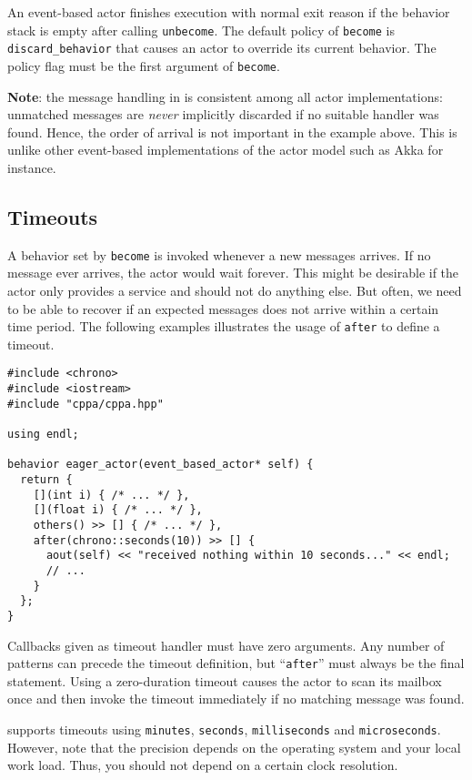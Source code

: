 An event-based actor finishes execution with normal exit reason if the behavior stack is empty after calling \lstinline^unbecome^.
The default policy of \lstinline^become^ is \lstinline^discard_behavior^ that causes an actor to override its current behavior.
The policy flag must be the first argument of \lstinline^become^.

\textbf{Note}: the message handling in \lib is consistent among all actor implementations: unmatched messages are \textit{never} implicitly discarded if no suitable handler was found.
Hence, the order of arrival is not important in the example above.
This is unlike other event-based implementations of the actor model such as Akka for instance.

\clearpage
\subsection{Timeouts}
\label{Sec::Receive::Timeouts}

A behavior set by \lstinline^become^ is invoked whenever a new messages arrives.
If no message ever arrives, the actor would wait forever.
This might be desirable if the actor only provides a service and should not do anything else.
But often, we need to be able to recover if an expected messages does not arrive within a certain time period. The following examples illustrates the usage of \lstinline^after^ to define a timeout.

\begin{lstlisting}
#include <chrono>
#include <iostream>
#include "cppa/cppa.hpp"

using endl;

behavior eager_actor(event_based_actor* self) {
  return {
    [](int i) { /* ... */ },
    [](float i) { /* ... */ },
    others() >> [] { /* ... */ },
    after(chrono::seconds(10)) >> [] {
      aout(self) << "received nothing within 10 seconds..." << endl;
      // ...
    }
  };
}
\end{lstlisting}

Callbacks given as timeout handler must have zero arguments.
Any number of patterns can precede the timeout definition, but  ``\lstinline^after^'' must always be the final statement.
Using a zero-duration timeout causes the actor to scan its mailbox once and then invoke the timeout immediately if no matching message was found.

\lib supports timeouts using \lstinline^minutes^, \lstinline^seconds^, \lstinline^milliseconds^ and \lstinline^microseconds^.
However, note that the precision depends on the operating system and your local work load.
Thus, you should not depend on a certain clock resolution.

